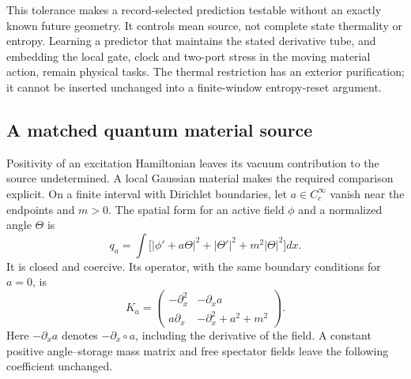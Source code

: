 This tolerance makes a record-selected prediction testable without
an exactly known future geometry. It controls mean source, not complete
state thermality or entropy. Learning a predictor that maintains the
stated derivative tube, and embedding the local gate, clock and
two-port stress in the moving material action, remain physical tasks.
The thermal restriction has an exterior purification; it cannot be
inserted unchanged into a finite-window entropy-reset argument.

\subsection{A matched quantum material source}
\label{sec:material-vacuum-source}

Positivity of an excitation Hamiltonian leaves its vacuum contribution
to the source undetermined. A local Gaussian material makes the required
comparison explicit. On a finite interval with Dirichlet boundaries,
let $a\in C_c^\infty$ vanish near the endpoints and $m>0$. The spatial
form for an active field $\phi$ and a normalized angle $\Theta$ is
\[
 q_a=\int\bigl[|\phi'+a\Theta|^2+|\Theta'|^2+m^2|\Theta|^2\bigr]dx.
\]
It is closed and coercive. Its operator, with the same boundary
conditions for $a=0$, is
\[
 K_a=\begin{pmatrix}-\partial_x^2&-\partial_x a\\
 a\partial_x&-\partial_x^2+a^2+m^2\end{pmatrix}.
\]
Here $-\partial_xa$ denotes $-\partial_x\circ a$, including the
derivative of the field. A constant positive angle--storage mass
matrix and free spectator fields leave the following coefficient unchanged.

